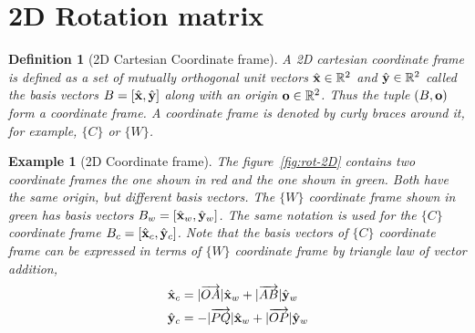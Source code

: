 \documentclass[twocolumn]{article}
\newtheorem{defn}{Definition}
\newtheorem{example}{Example}
\begin{document}
\section{2D  Rotation matrix}
\begin{defn}[2D  Cartesian Coordinate frame]
 A 2D cartesian coordinate  frame  is defined as a set of mutually orthogonal unit
 vectors  $\hat{\mathbf{x}} \in  \mathbb{R}^2$  and
 $\hat{\mathbf{y}}\in  \mathbb{R}^2 $ called the basis vectors $B = [\hat{\mathbf{x}}, \hat{\mathbf{y}}]$
 along  with  an origin  $\mathbf{o}\in  \mathbb{R}^2$. Thus the tuple  $(B, \mathbf{o})$ form a
 coordinate frame. A  coordinate  frame is denoted  by curly braces around it,
 for  example, $\{C\}$ or $\{W\}$.
\end{defn}

\begin{example}[2D Coordinate frame]
  The figure~\ref{fig:rot-2D} contains two coordinate frames the one  shown  in
  red and   the one   shown in green. Both have  the  same origin, but
  different  basis vectors. The $\{W\}$ coordinate frame shown in green has
  basis vectors $B_w = [\hat{\mathbf{x}}_w, \hat{\mathbf{y}}_w]$. The same notation is used
  for the $\{C\}$ coordinate frame $B_c  =  [ \hat{\mathbf{x}}_c, \hat{\mathbf{y}}_c]$.
  Note that the basis vectors of $\{C\}$  coordinate frame  can be
  expressed  in  terms of $\{W\}$  coordinate frame by triangle  law of vector addition,
  \begin{equation}
  \begin{aligned}
    \hat{\mathbf{x}}_c &= |\overrightarrow{OA}|\hat{\mathbf{x}}_w + |\overrightarrow{AB}|\hat{\mathbf{y}}_w
    \\
    \hat{\mathbf{y}}_c &= -|\overrightarrow{PQ}|\hat{\mathbf{x}}_w + |\overrightarrow{OP}|\hat{\mathbf{y}}_w
  \end{aligned}
  \label{eq:c-as-w}
  \end{equation}


\end{example}
\end{document}
